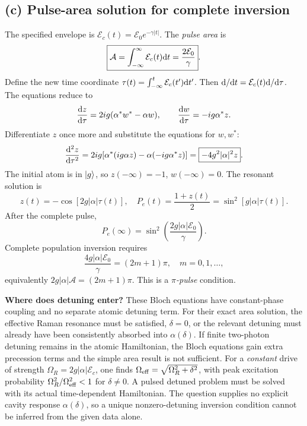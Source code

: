\subsection*{(c) Pulse-area solution for complete inversion}
The specified envelope is
\(\mathcal E_c(t)=\mathcal E_0e^{-\gamma|t|}\).
The \emph{pulse area} is
\[
\boxed{\mathcal A=
\int_{-\infty}^\infty\mathcal E_c(t)\mathrm{d} t
=\frac{2\mathcal E_0}{\gamma}}.
\]
Define the new time coordinate
\(\tau(t)=\int_{-\infty}^t\mathcal E_c(t')\mathrm{d} t'\).
Then \(\mathrm{d}/\mathrm{d} t=\mathcal E_c(t)\mathrm{d}/\mathrm{d}\tau\).
The equations reduce to
\[
\frac{\mathrm{d} z}{\mathrm{d}\tau}
=2ig(\alpha^*w^*-\alpha w),\qquad
\frac{\mathrm{d} w}{\mathrm{d}\tau}=-ig\alpha^*z.
\]
Differentiate \(z\) once more and substitute
the equations for \(w,w^*\):
\[
\frac{\mathrm{d}^2z}{\mathrm{d}\tau^2}
=2ig[
\alpha^*(ig\alpha z)-\alpha(-ig\alpha^*z)]
=\boxed{-4g^2|\alpha|^2z}.
\]
The initial atom is in \(\left\lvert g\right\rangle\), so
\(z(-\infty)=-1\), \(w(-\infty)=0\).
The resonant solution is
\[
\boxed{z(t)=-\cos[2g|\alpha|\tau(t)]},\quad
P_e(t)=\frac{1+z(t)}2
=\sin^2[g|\alpha|\tau(t)].
\]
After the complete pulse,
\[
\boxed{P_e(\infty)
=\sin^2\!\left(\frac{2g|\alpha|\mathcal E_0}{\gamma}\right)}.
\]
Complete population inversion requires
\[
\boxed{\frac{4g|\alpha|\mathcal E_0}{\gamma}
=(2m+1)\pi,\quad m=0,1,\ldots,}
\]
equivalently \(2g|\alpha|\mathcal A=(2m+1)\pi\).
This is a \emph{\(\pi\)-pulse} condition.

\textbf{Where does detuning enter?} These Bloch
equations have constant-phase coupling and no
separate atomic detuning term. For their exact
area solution, the effective Raman resonance
must be satisfied, \(\delta=0\), or the relevant
detuning must already have been consistently
absorbed into \(\alpha(\delta)\). If finite
two-photon detuning remains in the atomic
Hamiltonian, the Bloch equations gain extra
precession terms and the simple area result
is not sufficient. For a \emph{constant} drive
of strength \(\Omega_R=2g|\alpha|\mathcal E_c\),
one finds \(\Omega_{\rm eff}=
\sqrt{\Omega_R^2+\delta^2}\), with peak
excitation probability
\(\Omega_R^2/\Omega_{\rm eff}^2<1\) for
\(\delta\ne0\). A pulsed detuned problem must
be solved with its actual time-dependent
Hamiltonian. The question supplies no explicit
cavity response \(\alpha(\delta)\), so a
unique nonzero-detuning inversion condition
cannot be inferred from the given data alone.

